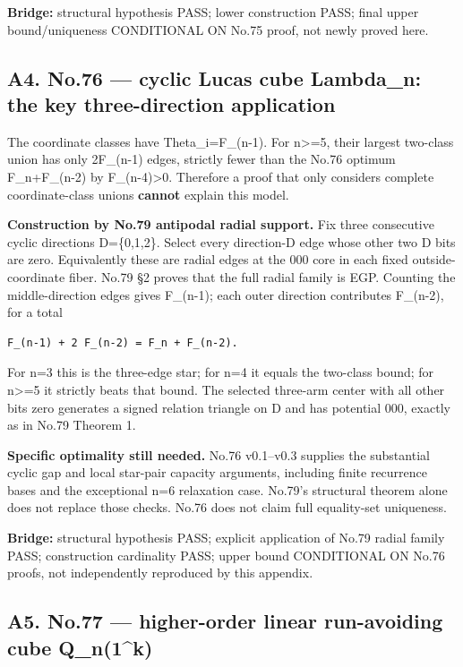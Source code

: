 \documentclass[
]{article}
\begin{document}
\textbf{Bridge:} structural hypothesis PASS; lower construction PASS;
final upper bound/uniqueness CONDITIONAL ON No.75 proof, not newly
proved here.

\subsection{A4. No.76 --- cyclic Lucas cube Lambda\_n: the key
three-direction
application}\label{a4.-no.76-cyclic-lucas-cube-lambda_n-the-key-three-direction-application}

The coordinate classes have \textbar Theta\_i\textbar=F\_(n-1). For
n\textgreater=5, their largest two-class union has only 2F\_(n-1) edges,
strictly fewer than the No.76 optimum F\_n+F\_(n-2) by
F\_(n-4)\textgreater0. Therefore a proof that only considers complete
coordinate-class unions \textbf{cannot} explain this model.

\textbf{Construction by No.79 antipodal radial support.} Fix three
consecutive cyclic directions D=\{0,1,2\}. Select every direction-D edge
whose other two D bits are zero. Equivalently these are radial edges at
the 000 core in each fixed outside-coordinate fiber. No.79 §2 proves
that the full radial family is EGP. Counting the middle-direction edges
gives F\_(n-1); each outer direction contributes F\_(n-2), for a total

\begin{verbatim}
F_(n-1) + 2 F_(n-2) = F_n + F_(n-2).
\end{verbatim}

For n=3 this is the three-edge star; for n=4 it equals the two-class
bound; for n\textgreater=5 it strictly beats that bound. The selected
three-arm center with all other bits zero generates a signed relation
triangle on D and has potential 000, exactly as in No.79 Theorem 1.

\textbf{Specific optimality still needed.} No.76 v0.1--v0.3 supplies the
substantial cyclic gap and local star-pair capacity arguments, including
finite recurrence bases and the exceptional n=6 relaxation case. No.79's
structural theorem alone does not replace those checks. No.76 does not
claim full equality-set uniqueness.

\textbf{Bridge:} structural hypothesis PASS; explicit application of
No.79 radial family PASS; construction cardinality PASS; upper bound
CONDITIONAL ON No.76 proofs, not independently reproduced by this
appendix.

\subsection{A5. No.77 --- higher-order linear run-avoiding cube
Q\_n(1\^{}k)}\label{a5.-no.77-higher-order-linear-run-avoiding-cube-q_n1k}
\end{document}
